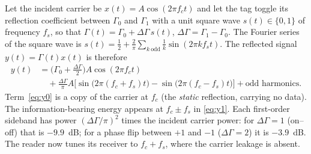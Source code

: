 Let the incident carrier be $x(t)=A\cos(2\pi f_ct)$ and let the tag toggle its
reflection coefficient between $\Gamma_0$ and $\Gamma_1$ with a unit square wave
$s(t)\in\{0,1\}$ of frequency $f_s$, so that $\Gamma(t)=\Gamma_0+\Delta\Gamma\,s(t)$,
$\Delta\Gamma=\Gamma_1-\Gamma_0$. The Fourier series of the square wave is
$s(t)=\tfrac12+\tfrac{2}{\pi}\sum_{k\ \mathrm{odd}}\tfrac1k\sin(2\pi kf_st)$. The
reflected signal $y(t)=\Gamma(t)x(t)$ is therefore
\begin{align}
 y(t)&=\Big(\Gamma_0+\tfrac{\Delta\Gamma}{2}\Big)A\cos(2\pi f_ct)\label{eq:y0}\\
 &\quad+\frac{\Delta\Gamma}{\pi}A\Big[\sin\big(2\pi(f_c+f_s)t\big)-\sin\big(2\pi(f_c-f_s)t\big)\Big]+\text{odd harmonics}.\label{eq:y1}
\end{align}
Term~\eqref{eq:y0} is a copy of the carrier at $f_c$ (the
\emph{static} reflection, carrying no data). The information-bearing
energy appears at $f_c\pm f_s$ in \eqref{eq:y1}. Each first-order sideband has power
$(\Delta\Gamma/\pi)^2$ times the incident carrier power: for
$\Delta\Gamma=1$ (on--off) that is $-9.9$~dB; for a phase flip between $+1$ and
$-1$ ($\Delta\Gamma=2$) it is $-3.9$~dB. The reader now tunes its receiver to
$f_c+f_s$, where the carrier leakage is absent.


